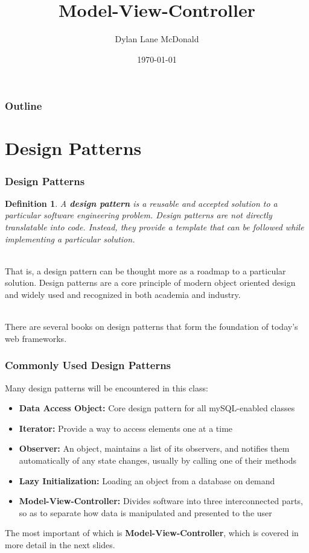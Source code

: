 \documentclass[aspectratio=169]{beamer}
\title{Model-View-Controller}
\author{Dylan Lane McDonald}
\institute{CNM STEMulus Center\\Web Development with PHP}
\date{\today}
\newtheorem{defn}{Definition}
\begin{document}
\lstset{language=Java}
\begin{frame}
\titlepage
\end{frame}

\begin{frame}
\frametitle{Outline}
\tableofcontents
\end{frame}

\section{Design Patterns}
\begin{frame}
\frametitle{Design Patterns}
\begin{defn}
A \textbf{design pattern} is a reusable and accepted solution to a particular software engineering problem. Design patterns are not directly translatable into code. Instead, they provide a template that can be followed while implementing a particular solution.
\end{defn}
\pause
\mbox{}\\
That is, a design pattern can be thought more as a roadmap to a particular solution. Design patterns are a core principle of modern object oriented design and widely used and recognized in both academia and industry.

\mbox{}\\
There are several books on design patterns that form the foundation of today's web frameworks. \cite{codeComplete, designPatterns, j2ee}
\end{frame}

\begin{frame}
\frametitle{Commonly Used Design Patterns}
Many design patterns will be encountered in this class:
\begin{itemize}
	\item \textbf{Data Access Object:} Core design pattern for all mySQL-enabled classes
	\item \textbf{Iterator:} Provide a way to access elements one at a time
	\item \textbf{Observer:} An object, maintains a list of its observers, and notifies them automatically of any state changes, usually by calling one of their methods
	\item \textbf{Lazy Initialization:} Loading an object from a database on demand
	\item \textbf{Model-View-Controller:} Divides software into three interconnected parts, so as to separate how data is manipulated and presented to the user
\end{itemize}
The most important of which is \textbf{Model-View-Controller}, which is covered in more detail in the next slides.
\end{frame}
\end{document}

